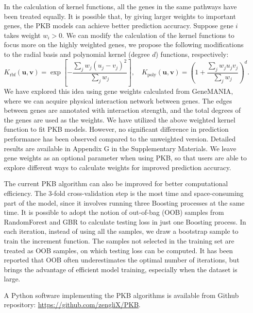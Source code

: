 \documentclass[a4paper,12pt]{article}
\newcommand{\bd}[1]{\mathbf{#1}}
\begin{document}
In the calculation of kernel functions, all the genes in the same pathways have been treated equally. It is possible that, by giving larger weights to important genes, the PKB models can achieve better prediction accuracy. Suppose gene $i$ takes weight $w_i > 0$. We can modify the calculation of the kernel functions to focus more on the highly weighted genes, we propose the following modifications to the radial basis and polynomial kernel (degree $d$) functions, respectively:
$$ K_{\text{rbf}}(\bd{u}, \bd{v})  =  \exp \left[ - \frac{\sum_j w_j (u_j - v_j)^2}{\sum_j w_j}  \right], \quad
K_{\text{poly}}(\bd{u}, \bd{v})  =  \left( 1 + \frac{ \sum_j w_j u_j v_j }{ \sum_j w_j } \right)^d.$$
We have explored this idea using gene weights calculated from GeneMANIA, \citep{warde2010genemania} where we can acquire physical interaction network between genes. The edges between genes are annotated with interaction strength, and the total degrees of the genes are used as the weights. We have utilized the above weighted kernel function to fit PKB models. However, no significant difference in prediction performance has been observed compared to the unweighted version. Detailed results are available in Appendix G in the Supplementary Materials. We leave gene weights as an optional parameter when using PKB, so that users are able to explore different ways to calculate weights for improved prediction accuracy.

The current PKB algorithm can also be improved for better computational efficiency. The 3-fold cross-validation step is the most time and space-consuming part of the model, since it involves running three Boosting processes at the same time. It is possible to adopt the notion of out-of-bag (OOB) samples from RandomForest and GBR to calculate testing loss in just one Boosting process. In each iteration, instead of using all the samples, we draw a bootstrap sample to train the increment function. The samples not selected in the training set are treated as OOB samples, on which testing loss can be computed. It has been reported that OOB often underestimates the optimal number of iterations, \citep{ridgeway2006gbm} but brings the advantage of efficient model training, especially when the dataset is large.

A Python software implementing the PKB algorithms is available from Github repository: \href{https://github.com/zengliX/PKB}{https://github.com/zengliX/PKB}. 
\newpage
	
	
\end{document}
